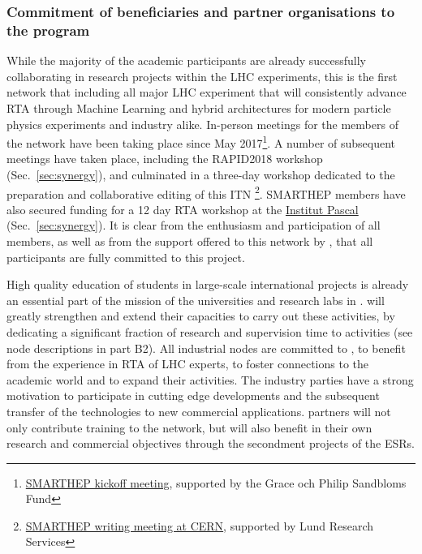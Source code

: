 \subsubsection{Commitment of beneficiaries and partner organisations to the program}

While the majority of the \acronym academic participants are already successfully collaborating in research projects within the LHC experiments, this is the first network that including all major LHC experiment that will consistently advance RTA through Machine Learning and hybrid architectures for modern particle physics experiments and industry alike. 
In-person meetings for the members of the \acronym network have been taking place since May 2017\footnote{\href{https://indico.lucas.lu.se/event/656/}{SMARTHEP kickoff meeting}, supported by the Grace och Philip Sandbloms Fund}. A number of subsequent meetings have taken place, including the RAPID2018 workshop (Sec.~\ref{sec:synergy}), and culminated in a three-day workshop dedicated to the preparation and collaborative editing of this ITN \footnote{\href{https://indico.cern.ch/event/777802/}{SMARTHEP writing meeting at CERN}, supported by Lund Research Services}. SMARTHEP members have also secured funding for a 12 day RTA workshop at the \href{https://www.universite-paris-saclay.fr/en/institut-pascal}{Institut Pascal} (Sec.~\ref{sec:synergy}).
It is clear from the enthusiasm and participation of all members, as well as from the support offered to this network by \lundentity, that all \acronym participants are fully committed to this project.

High quality education of students in large-scale international projects is already an essential part of the mission of the universities and research labs in \acronym. 
\acronym will greatly strengthen and extend their capacities to carry out these activities, by dedicating a significant fraction of research and supervision time to \acronym activities (see node descriptions in part B2).
All industrial nodes are committed to \acronym, to benefit from the experience in RTA of LHC experts, to foster connections to the academic world and to expand their activities. 
The industry parties have a strong motivation to participate in cutting edge developments and the subsequent transfer of the technologies to new commercial applications.
\acronym partners will not only contribute training to the network, but will also benefit in their own research and commercial objectives through the secondment projects of the ESRs. 

